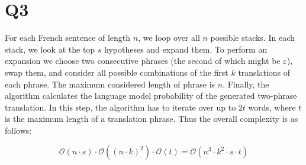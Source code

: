 \section*{Q3}
For each French sentence of length $n$, we loop over all $n$ possible stacks. In each stack, we look at the top $s$ hypotheses and expand them. To perform an expansion we choose two consecutive phrases (the second of which might be $\varepsilon$), swap them, and consider all possible combinations of the first $k$ translations of each phrase. The maximum considered length of phrase is $n$. Finally, the algorithm calculates the language model probability of the generated two-phrase translation. In this step, the algorithm has to iterate over up to $2 t$ words, where $t$ is the maximum length of a translation phrase. Thus the overall complexity is as follows:

\[
\mathcal{O}(n \cdot s) \cdot \mathcal{O}({(n \cdot k)}^2)
\cdot \mathcal{O}(t)
= \mathcal{O}(n^3 \cdot k^2 \cdot s \cdot t)
\]
